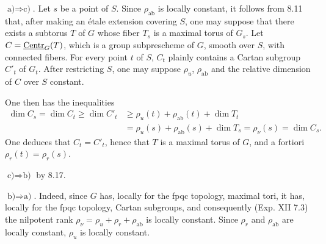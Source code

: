 $\text{a)}\Rightarrow\text{c)}$. Let $s$ be a point of $S$. Since $\rho_{\mathrm{ab}}$ is locally constant, it follows from 8.11 that, after making an étale extension covering $S$, one may suppose that there exists a subtorus $T$ of $G$ whose fiber $T_s$ is a maximal torus of $G_s$. Let $C=\underline{\mathrm{Centr}}_G(T)$, which is a group subprescheme of $G$, smooth over $S$, with connected fibers. For every point $t$ of $S$, $C_t$ plainly contains a Cartan subgroup $C'_t$ of $G_t$. After restricting $S$, one may suppose $\rho_u$, $\rho_{\mathrm{ab}}$ and the relative dimension of $C$ over $S$ constant.

One then has the inequalities
\[
\begin{aligned}
\dim C_s=\dim C_t\geq\dim C'_t
&\geq\rho_u(t)+\rho_{\mathrm{ab}}(t)+\dim T_t\\
&=\rho_u(s)+\rho_{\mathrm{ab}}(s)+\dim T_s=\rho_\nu(s)=\dim C_s.
\end{aligned}
\]
One deduces that $C_t=C'_t$, hence that $T$ is a maximal torus of $G$, and a fortiori $\rho_r(t)=\rho_r(s)$.

$\text{c)}\Rightarrow\text{b)}$ by 8.17.

$\text{b)}\Rightarrow\text{a)}$. Indeed, since $G$ has, locally for the fpqc topology, maximal tori, it has, locally for the fpqc topology, Cartan subgroups, and consequently (Exp. XII 7.3) the nilpotent rank $\rho_\nu=\rho_u+\rho_r+\rho_{\mathrm{ab}}$ is locally constant. Since $\rho_r$ and $\rho_{\mathrm{ab}}$ are locally constant, $\rho_u$ is locally constant.
